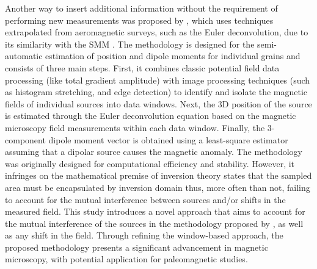 Another way to insert additional information without the requirement of performing new measurements was proposed by \citet{Souza-Junior2023b}, which uses techniques extrapolated from aeromagnetic surveys, such as the Euler deconvolution, due to its similarity with the SMM \citep{Weiss2007}. The methodology is designed for the semi-automatic estimation of position and dipole moments for individual grains and consists of three main steps. First, it combines classic potential field data processing (like total gradient amplitude) with image processing techniques (such as histogram stretching, and edge detection) to identify and isolate the magnetic fields of individual sources into data windows. Next, the 3D position of the source is estimated through the Euler deconvolution equation based on the magnetic microscopy field measurements within each data window. Finally, the 3-component dipole moment vector is obtained using a least-square estimator assuming that a dipolar source causes the magnetic anomaly. The methodology was originally designed for computational efficiency and stability. However, it infringes on the mathematical premise of inversion theory states that the sampled area must be encapsulated by inversion domain \citep{Baratchart2013, Lima2013} thus, more often than not, failing to account for the mutual interference between sources and/or shifts in the measured field. This study introduces a novel approach that aims to account for the mutual interference of the sources in the methodology proposed by \citet{Souza-Junior2023b}, as well as any shift in the field. Through refining the window-based approach, the proposed methodology presents a significant advancement in magnetic microscopy, with potential application for paleomagnetic studies. 








